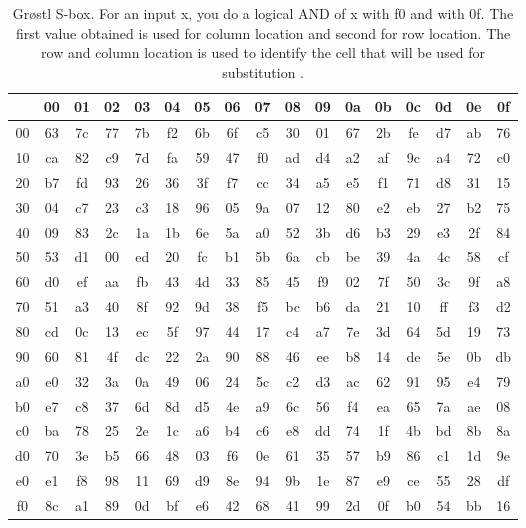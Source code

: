 \begin{itemize}
\begin{table}
\begin{center}
  \begin{tabular}{ c | *{16}{c}}
     & 00 & 01 & 02 & 03 & 04 & 05 & 06 & 07 & 08 & 09 & 0a & 0b & 0c & 0d & 0e & 0f \\ \hline
  00 & 63 & 7c & 77 & 7b & f2 & 6b & 6f & c5 & 30 & 01 & 67 & 2b & fe & d7 & ab & 76 \\ 
  10 & ca & 82 & c9 & 7d & fa & 59 & 47 & f0 & ad & d4 & a2 & af & 9c & a4 & 72 & c0 \\
  20 & b7 & fd & 93 & 26 & 36 & 3f & f7 & cc & 34 & a5 & e5 & f1 & 71 & d8 & 31 & 15 \\
  30 & 04 & c7 & 23 & c3 & 18 & 96 & 05 & 9a & 07 & 12 & 80 & e2 & eb & 27 & b2 & 75 \\
  40 & 09 & 83 & 2c & 1a & 1b & 6e & 5a & a0 & 52 & 3b & d6 & b3 & 29 & e3 & 2f & 84 \\
  50 & 53 & d1 & 00 & ed & 20 & fc & b1 & 5b & 6a & cb & be & 39 & 4a & 4c & 58 & cf \\
  60 & d0 & ef & aa & fb & 43 & 4d & 33 & 85 & 45 & f9 & 02 & 7f & 50 & 3c & 9f & a8 \\
  70 & 51 & a3 & 40 & 8f & 92 & 9d & 38 & f5 & bc & b6 & da & 21 & 10 & ff & f3 & d2 \\
  80 & cd & 0c & 13 & ec & 5f & 97 & 44 & 17 & c4 & a7 & 7e & 3d & 64 & 5d & 19 & 73 \\
  90 & 60 & 81 & 4f & dc & 22 & 2a & 90 & 88 & 46 & ee & b8 & 14 & de & 5e & 0b & db \\
  a0 & e0 & 32 & 3a & 0a & 49 & 06 & 24 & 5c & c2 & d3 & ac & 62 & 91 & 95 & e4 & 79 \\
  b0 & e7 & c8 & 37 & 6d & 8d & d5 & 4e & a9 & 6c & 56 & f4 & ea & 65 & 7a & ae & 08 \\
  c0 & ba & 78 & 25 & 2e & 1c & a6 & b4 & c6 & e8 & dd & 74 & 1f & 4b & bd & 8b & 8a \\
  d0 & 70 & 3e & b5 & 66 & 48 & 03 & f6 & 0e & 61 & 35 & 57 & b9 & 86 & c1 & 1d & 9e \\
  e0 & e1 & f8 & 98 & 11 & 69 & d9 & 8e & 94 & 9b & 1e & 87 & e9 & ce & 55 & 28 & df \\
  f0 & 8c & a1 & 89 & 0d & bf & e6 & 42 & 68 & 41 & 99 & 2d & 0f & b0 & 54 & bb & 16 \\
  \end{tabular}
  \caption{Gr{\o}stl S-box. For an input x, you do a logical AND of x with f0 and with 0f.
  The first value obtained is used for column location and second for row location. The
  row and column location is used to identify the cell that will be used for substitution
  \cite{00019}.}
  \label{table:Groestlsbox}
\end{center}
\end{table}


\end{itemize}
